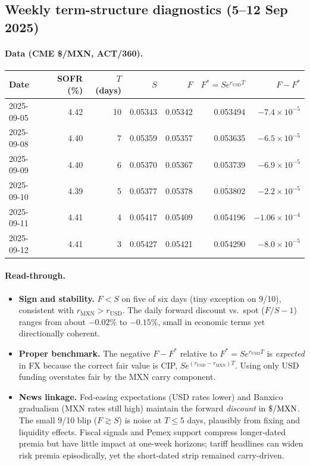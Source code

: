 \documentclass[10pt,a4paper]{article} %
\begin{document}
\subsection{Weekly term-structure diagnostics (5–12 Sep 2025)}
\paragraph{Data (CME \$/MXN, ACT/360).}
\begin{center}
\begin{tabular}{lrrrrrr}
\toprule
Date & SOFR (\%) & \(T\) (days) & \(S\) & \(F\) & \(F^{*}=S e^{r_{\mathrm{USD}}T}\) & \(F{-}F^{*}\) \\
\midrule
2025-09-05 & 4.42 & 10 & 0.05343 & 0.05342 & 0.053494 & \(-7.4\times10^{-5}\) \\
2025-09-08 & 4.40 & 7  & 0.05359 & 0.05357 & 0.053635 & \(-6.5\times10^{-5}\) \\
2025-09-09 & 4.40 & 6  & 0.05370 & 0.05367 & 0.053739 & \(-6.9\times10^{-5}\) \\
2025-09-10 & 4.39 & 5  & 0.05377 & 0.05378 & 0.053802 & \(-2.2\times10^{-5}\) \\
2025-09-11 & 4.41 & 4  & 0.05417 & 0.05409 & 0.054196 & \(-1.06\times10^{-4}\) \\
2025-09-12 & 4.41 & 3  & 0.05427 & 0.05421 & 0.054290 & \(-8.0\times10^{-5}\) \\
\bottomrule
\end{tabular}
\end{center}

\paragraph{Read-through.}
\begin{itemize}
  \item \textbf{Sign and stability.} \(F<S\) on five of six days (tiny exception on 9/10), consistent with \(r_{\mathrm{MXN}}>r_{\mathrm{USD}}\). The daily forward discount vs.\ spot (\(F/S-1\)) ranges from about \(-0.02\%\) to \(-0.15\%\), small in economic terms yet directionally coherent.
  \item \textbf{Proper benchmark.} The negative \(F-F^{*}\) relative to \(F^{*}=S e^{r_{\mathrm{USD}}T}\) is \emph{expected} in FX because the correct fair value is CIP, \(S e^{(r_{\mathrm{USD}}-r_{\mathrm{MXN}})T}\). Using only USD funding overstates fair by the MXN carry component.
  \item \textbf{News linkage.} Fed-easing expectations (USD rates lower) and Banxico gradualism (MXN rates still high) maintain the forward \emph{discount} in \(\$/{\rm MXN}\). The small 9/10 blip (\(F\gtrsim S\)) is noise at \(T\leq 5\) days, plausibly from fixing and liquidity effects. Fiscal signals and Pemex support compress longer-dated premia but have little impact at one-week horizons; tariff headlines can widen risk premia episodically, yet the short-dated strip remained carry-driven.
\end{itemize}
\end{document}

